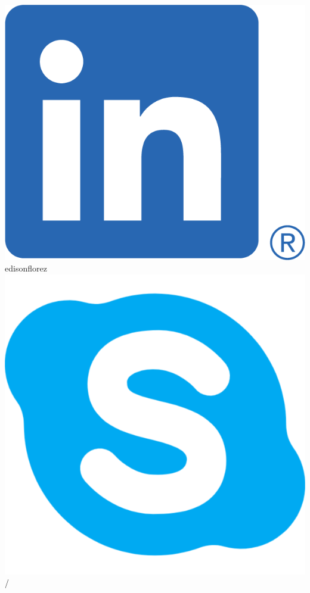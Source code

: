 \begin{center}
{        \includegraphics[scale=0.1]{figs/linkedin_bug.png}
    } edisonflorez
    \hspace*{5mm}
    \includegraphics[scale=0.023]{figs/skype_logo.png}
    /

\end{center}
